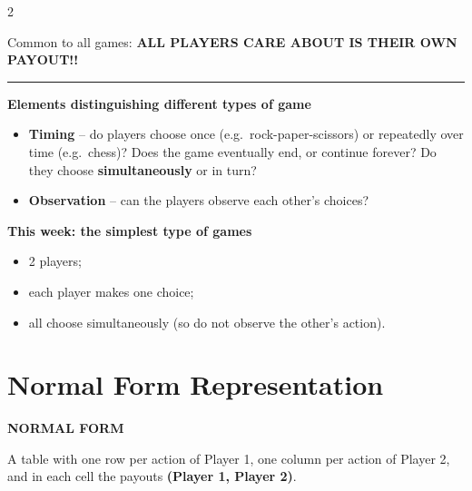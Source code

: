 \documentclass[a4paper,9pt]{extarticle}
\newcommand{\separator}{
\vspace{2pt}
\hrule
\vspace{3pt}
}
\begin{document}
\begin{multicols}{2}
\begin{definition}
\begin{itemize}
\end{itemize}

\end{definition}


\begin{important}

Common to all games: \textbf{ALL PLAYERS CARE ABOUT IS THEIR OWN PAYOUT!!}

\end{important}


\separator


\textbf{Elements distinguishing different types of game}

\begin{itemize}

\item \textbf{Timing} -- do players choose once (e.g.\ rock-paper-scissors) or repeatedly
over time (e.g.\ chess)? Does the game eventually end, or continue forever? Do they choose
\textbf{simultaneously} or in turn?

\item \textbf{Observation} -- can the players observe each other's choices?

\end{itemize}


\textbf{This week: the simplest type of games}

\begin{itemize}

\item 2 players;

\item each player makes one choice;

\item all choose simultaneously (so do not observe the other's action).

\end{itemize}



\section{Normal Form Representation}


\begin{definition}

\textbf{NORMAL FORM}

A table with one row per action of Player 1, one column per action of Player 2, and in each
cell the payouts \textbf{(Player 1, Player 2)}.


\end{definition}
\end{multicols}
\end{document}
